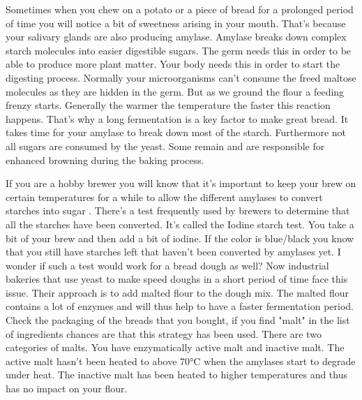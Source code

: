 Sometimes when you chew on a potato or a piece of bread
for a prolonged period of time you will notice a bit of sweetness
arising in your mouth. That's because your salivary glands
are also producing amylase. Amylase breaks down complex
starch molecules into easier digestible sugars. The germ
needs this in order to be able to produce more plant matter.
Your body needs this in order to start the digesting process.
Normally your microorganisms can't consume the freed maltose molecules
as they are hidden in the germ. But as we ground the flour
a feeding frenzy starts. Generally the warmer the temperature
the faster this reaction happens. That's why a long fermentation
is a key factor to make great bread. It takes time
for your amylase to break down most of the starch. Furthermore
not all sugars are consumed by the yeast. Some remain and
are responsible for enhanced browning during the baking
process.

If you are a hobby brewer you will know that it's
important to keep your brew on certain temperatures for a
while to allow the different amylases to convert starches
into sugar \cite{beer+amylase}. There's a test frequently used by brewers
to determine that all the starches have been converted.
It's called the Iodine starch test. You take a bit of your brew
and then add a bit of iodine. If the color is blue/black
you know that you still have starches left that haven't been
converted by amylases yet. I wonder if such a test would work
for a bread dough as well? Now industrial bakeries
that use yeast to make speed doughs in a short period of
time face this issue. Their approach is to add malted
flour to the dough mix. The malted flour contains a lot
of enzymes and will thus help to have a faster fermentation
period. Check the packaging of the breads that you bought,
if you find "malt" in the list of ingredients chances
are that this strategy has been used. There are two categories
of malts. You have enzymatically active malt and inactive
malt. The active malt hasn't been heated to above 70°C
when the amylases start to degrade under heat. The inactive
malt has been heated to higher temperatures and thus
has no impact on your flour.

